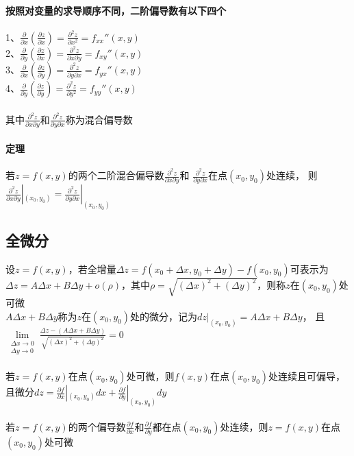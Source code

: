 \documentclass{article}
\begin{document}
\begin{flushleft}
	\paragraph{按照对变量的求导顺序不同，二阶偏导数有以下四个}
	1、$\frac{\partial}{\partial x}(\frac{\partial z}{\partial x})=
	\frac{\partial^2z}{\partial x^2}=f_{xx}''(x,y)$\\
	2、$\frac{\partial}{\partial y}(\frac{\partial z}{\partial x})=
	\frac{\partial^2z}{\partial x\partial y}=f_{xy}''(x,y)$\\
	3、$\frac{\partial}{\partial x}(\frac{\partial z}{\partial y})=
	\frac{\partial^2z}{\partial y\partial x}=f_{yx}''(x,y)$\\
	4、$\frac{\partial}{\partial y}(\frac{\partial z}{\partial y})=
	\frac{\partial^2z}{\partial y^2}=f_{yy}''(x,y)$\\
	~\\
	其中$\frac{\partial^2z}{\partial x\partial y}$和$\frac{\partial^2z}{\partial y\partial x}$称为混合偏导数\\
	
	\paragraph{定理}
	若$z=f(x,y)$的两个二阶混合偏导数$\frac{\partial^2z}{\partial x\partial y}$和
	$\frac{\partial^2z}{\partial y\partial x}$在点$(x_0,y_0)$处连续，
	则$\frac{\partial^2z}{\partial x\partial y}|_{(x_0,y_0)}=
	\frac{\partial^2z}{\partial y\partial x}|_{(x_0,y_0)}$\\
	
	\subsection{全微分}
	
	设$z=f(x,y)$，若全增量$\Delta z=f(x_0+\Delta x,y_0+\Delta y)-f(x_0,y_0)$可表示为$\Delta z=A\Delta x+B\Delta y+o(\rho)$，其中$\rho=\sqrt{(\Delta x)^2+(\Delta y)^2}$，则称$z$在$(x_0,y_0)$处可微\\
	$A\Delta x+B\Delta y$称为$z$在$(x_0,y_0)$处的微分，记为$dz|_{(x_0,y_0)}=A\Delta x+B\Delta y$，
	且$\lim\limits_{\substack{\Delta x\to 0\\ \Delta y\to 0}}\frac{\Delta z-(A\Delta x+B\Delta y)}{\sqrt{(\Delta x)^2+(\Delta y)^2}}=0$\\
	~\\
	若$z=f(x,y)$在点$(x_0,y_0)$处可微，则$f(x,y)$在点$(x_0,y_0)$处连续且可偏导，且微分$dz=\frac{\partial f}{\partial x}|_(x_0,y_0)dx+\frac{\partial f}{\partial y}|_(x_0,y_0)dy$\\
	~\\
	若$z=f(x,y)$的两个偏导数$\frac{\partial f}{\partial x}$和$\frac{\partial f}{\partial y}$都在点$(x_0,y_0)$处连续，则$z=f(x,y)$在点$(x_0,y_0)$处可微\\
	

\end{flushleft}
\end{document}
